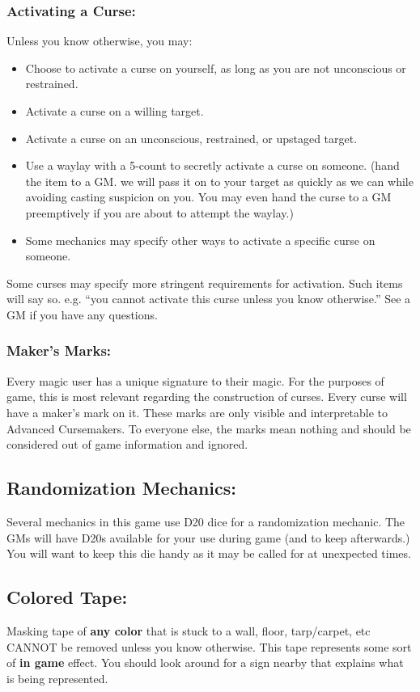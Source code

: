 \documentclass[sheet]{GL2020}
\begin{document}
{{\subsubsection{Activating a Curse:}
Unless you know otherwise, you may:
\begin{itemize}
	\item Choose to activate a curse on yourself, as long as you are not unconscious or restrained.
	\item Activate a curse on a willing target. 
	\item Activate a curse on an unconscious, restrained, or upstaged target.
	\item Use a waylay with a 5-count to secretly activate a curse on someone. (hand the item to a GM. we will pass it on to your target as quickly as we can while avoiding casting suspicion on you. You may even hand the curse to a GM preemptively if you are about to attempt the waylay.)
	\item Some mechanics may specify other ways to activate a specific curse on someone.
\end{itemize}

Some curses may specify more stringent requirements for activation. Such items will say so. e.g. ``you cannot activate this curse unless you know otherwise.'' See a GM if you have any questions.

\subsubsection{Maker's Marks:}
Every magic user has a unique signature to their magic. For the purposes of game, this is most relevant regarding the construction of curses. Every curse will have a maker's mark on it. These marks are only visible and interpretable to Advanced Cursemakers. To everyone else, the marks mean nothing and should be considered out of game information and ignored. 

\subsection{Randomization Mechanics:}
Several mechanics in this game use D20 dice for a randomization mechanic. The GMs will have D20s available for your use during game (and to keep afterwards.) You will want to keep this die handy as it may be called for at unexpected times.

\subsection{Colored Tape:}
Masking tape of \textbf{any color} that is stuck to a wall, floor, tarp/carpet, etc CANNOT be removed unless you know otherwise. This tape represents some sort of \textbf{in game} effect. You should look around for a sign nearby that explains what is being represented.

}}
\end{document}
